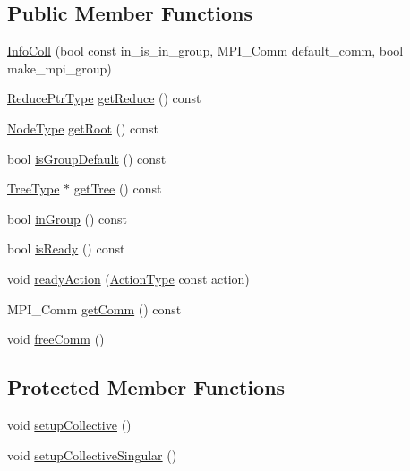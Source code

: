 \subsection*{Public Member Functions}
\begin{DoxyCompactItemize}
\item 
\hyperlink{structvt_1_1group_1_1_info_coll_a1181dfe3d01399d8e903d700461d2d7f}{Info\+Coll} (bool const in\+\_\+is\+\_\+in\+\_\+group, M\+P\+I\+\_\+\+Comm default\+\_\+comm, bool make\+\_\+mpi\+\_\+group)
\item 
\hyperlink{structvt_1_1group_1_1_info_coll_a1b9fe0214f622ed9e8987531f44ef1fa}{Reduce\+Ptr\+Type} \hyperlink{structvt_1_1group_1_1_info_coll_a297cafe0cae350b83a677db585865e62}{get\+Reduce} () const
\item 
\hyperlink{namespacevt_a866da9d0efc19c0a1ce79e9e492f47e2}{Node\+Type} \hyperlink{structvt_1_1group_1_1_info_coll_a5724786f46add3ccf7ca081774609f0c}{get\+Root} () const
\item 
bool \hyperlink{structvt_1_1group_1_1_info_coll_a6adf605b8d46a4174a8fd1321fd8fd3f}{is\+Group\+Default} () const
\item 
\hyperlink{structvt_1_1group_1_1_info_base_a96e01b6097ed7b2bc299027d0a7a1b1e}{Tree\+Type} $\ast$ \hyperlink{structvt_1_1group_1_1_info_coll_a2e7551dd6e85e5f3a6a7907b70f040c4}{get\+Tree} () const
\item 
bool \hyperlink{structvt_1_1group_1_1_info_coll_a09abdfe4684a0d7997441a97756ea237}{in\+Group} () const
\item 
bool \hyperlink{structvt_1_1group_1_1_info_coll_aec831cf27c5e2492657c5a2209718ae0}{is\+Ready} () const
\item 
void \hyperlink{structvt_1_1group_1_1_info_coll_ad2eb5a689e4b035e51a0a7db9fffd488}{ready\+Action} (\hyperlink{namespacevt_ae0a5a7b18cc99d7b732cb4d44f46b0f3}{Action\+Type} const action)
\item 
M\+P\+I\+\_\+\+Comm \hyperlink{structvt_1_1group_1_1_info_coll_a9f9dfa148d52cdc913fbaf1398f1fb48}{get\+Comm} () const
\item 
void \hyperlink{structvt_1_1group_1_1_info_coll_a0461bfa4ce243b30df15e82f01195ad7}{free\+Comm} ()
\end{DoxyCompactItemize}
\subsection*{Protected Member Functions}
\begin{DoxyCompactItemize}
\item 
void \hyperlink{structvt_1_1group_1_1_info_coll_ad6053b31361b42674c4a72cc076e4636}{setup\+Collective} ()
\item 
void \hyperlink{structvt_1_1group_1_1_info_coll_a89ff0c94d9e1019761d7fb019835621c}{setup\+Collective\+Singular} ()
\end{DoxyCompactItemize}

